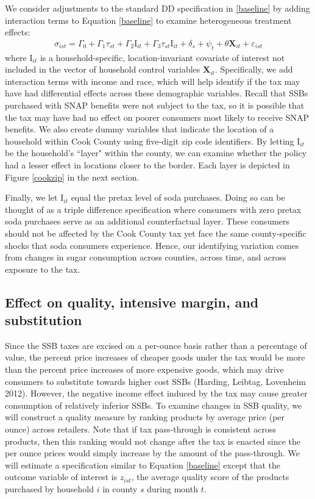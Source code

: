 \documentclass[12pt]{article}
\begin{document}
We consider adjustments to the standard DD specification in \eqref{baseline} by adding interaction terms to Equation \ref{baseline} to examine heterogeneous treatment effects:
\begin{align}
\sigma_{ist} = \Gamma_0 + \Gamma_1 \tau_{st} + \Gamma_2 \text{I}_{it} + \Gamma_3 \tau_{st} \text{I}_{it} + \delta_s + \psi_t + \theta \mathbf{X}_{it} + \varepsilon_{ist} \label{het}
\end{align}
where $\text{I}_{it}$ is a household-specific, location-invariant covariate of interest not included in the vector of household control variables $\mathbf{X}_{it}$. Specifically, we add interaction terms with income and race, which will help identify if the tax may have had differential effects across these demographic variables. Recall that SSBs purchased with SNAP benefits were not subject to the tax, so it is possible that the tax may have had no effect on poorer consumers most likely to receive SNAP benefits. We also create dummy variables that indicate the location of a household within Cook County using five-digit zip code identifiers. By letting $\text{I}_{it}$ be the household's ``layer" within the county, we can examine whether the policy had a lesser effect in locations closer to the border. Each layer is depicted in Figure \ref{cookzip} in the next section.

Finally, we let $\text{I}_{it}$ equal the pretax level of soda purchases. Doing so can be thought of as a triple difference specification where consumers with zero pretax soda purchases serve as an additional counterfactual layer. These consumers should not be affected by the Cook County tax yet face the same county-specific shocks that soda consumers experience. Hence, our identifying variation comes from changes in sugar consumption across counties, across time, and across exposure to the tax.

\subsection{Effect on quality, intensive margin, and substitution}

Since the SSB taxes are excised on a per-ounce basis rather than a percentage of value, the percent price increases of cheaper goods under the tax would be more than the percent price increases of more expensive goods, which may drive consumers to substitute towards higher cost SSBs (Harding, Leibtag, Lovenheim 2012). However, the negative income effect induced by the tax may cause greater consumption of relatively inferior SSBs. To examine changes in SSB quality, we will construct a quality measure by ranking products by average price (per ounce) across retailers. Note that if tax pass-through is consistent across products, then this ranking would not change after the tax is enacted since the per ounce prices would simply increase by the amount of the pass-through. We will estimate a specification similar to Equation \ref{baseline} except that the outcome variable of interest is $z_{ist}$, the average quality score of the products purchased by household $i$ in county $s$ during month $t$.
\end{document}
